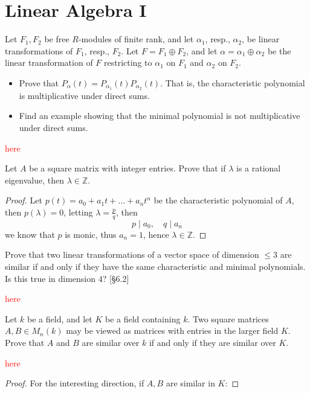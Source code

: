 \documentclass[openany]{book}
\newcommand{\Z}{\mathbb{Z}}
\begin{document}
\chapter{Linear Algebra I}




\begin{prob}[6.10]
    Let \( F_1, F_2 \) be free \( R \)-modules of finite rank, and let \( \alpha_1 \), resp., \( \alpha_2 \), be linear transformations of \( F_1 \), resp., \( F_2 \). Let \( F = F_1 \oplus F_2 \), and let \( \alpha = \alpha_1 \oplus \alpha_2 \) be the linear transformation of \( F \) restricting to \( \alpha_1 \) on \( F_1 \) and \( \alpha_2 \) on \( F_2 \).

    \begin{itemize}
        \item Prove that \( P_\alpha(t) = P_{\alpha_1}(t)P_{\alpha_2}(t) \). That is, the characteristic polynomial is multiplicative under direct sums.
    
        \item Find an example showing that the minimal polynomial is not multiplicative under direct sums.
    \end{itemize}
\end{prob}
\textcolor{red}{here}


\begin{prob}[6.13]
    Let $A$ be a square matrix with integer entries. Prove that if $\lambda$ is a rational eigenvalue, then $\lambda\in\mathbb{Z}$.
\end{prob}

\begin{proof}
    Let $p(t)=a_0+a_1t+\dots+a_nt^n$ be the characteristic polynomial of $A$, then $p(\lambda)=0$, letting $\lambda=\frac{p}{q}$, then 
    \begin{equation*}
        p\mid a_0,\quad q\mid a_n
    \end{equation*}
    we know that $p$ is monic, thus $a_n=1$, hence $\lambda\in\Z$.
\end{proof}

\begin{prob}[7.3]
    Prove that two linear transformations of a vector space of dimension \(\leq 3\) are similar if and only if they have the same characteristic and minimal polynomials. Is this true in dimension \(4\)? [§6.2]
\end{prob}
\textcolor{red}{here}

\begin{prob}[7.4]
    Let \(k\) be a field, and let \(K\) be a field containing \(k\). Two square matrices \(A, B \in M_n(k)\) may be viewed as matrices with entries in the larger field \(K\). Prove that \(A\) and \(B\) are similar over \(k\) if and only if they are similar over \(K\).
\end{prob}
\textcolor{red}{here}
\begin{proof}
    For the interesting direction, if $A,B$ are similar in $K$: 
\end{proof}
\end{document}
